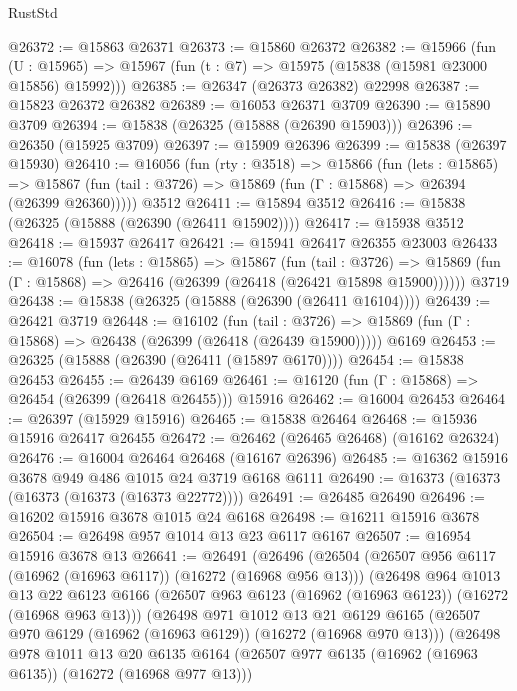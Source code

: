 \begin{lexlean}{RustStd}
\begin{coremodule}
@26372 := @15863 @26371
@26373 := @15860 @26372
@26382 := @15966
    (fun (U : @15965) => @15967 (fun (t : @7) => @15975 (@15838 (@15981 @23000 @15856) @15992)))
@26385 := @26347 (@26373 @26382) @22998
@26387 := @15823 @26372 @26382
@26389 := @16053 @26371 @3709
@26390 := @15890 @3709
@26394 := @15838 (@26325 (@15888 (@26390 @15903)))
@26396 := @26350 (@15925 @3709)
@26397 := @15909 @26396
@26399 := @15838 (@26397 @15930)
@26410 := @16056
    (fun (rty : @3518) =>
    @15866
      (fun (lets : @15865) =>
      @15867 (fun (tail : @3726) => @15869 (fun (Γ : @15868) => @26394 (@26399 @26360)))))
    @3512
@26411 := @15894 @3512
@26416 := @15838 (@26325 (@15888 (@26390 (@26411 @15902))))
@26417 := @15938 @3512
@26418 := @15937 @26417
@26421 := @15941 @26417 @26355 @23003
@26433 := @16078
    (fun (lets : @15865) =>
    @15867
      (fun (tail : @3726) =>
      @15869 (fun (Γ : @15868) => @26416 (@26399 (@26418 (@26421 @15898 @15900))))))
    @3719
@26438 := @15838 (@26325 (@15888 (@26390 (@26411 @16104))))
@26439 := @26421 @3719
@26448 := @16102
    (fun (tail : @3726) => @15869 (fun (Γ : @15868) => @26438 (@26399 (@26418 (@26439 @15900)))))
    @6169
@26453 := @26325 (@15888 (@26390 (@26411 (@15897 @6170))))
@26454 := @15838 @26453
@26455 := @26439 @6169
@26461 := @16120 (fun (Γ : @15868) => @26454 (@26399 (@26418 @26455))) @15916
@26462 := @16004 @26453
@26464 := @26397 (@15929 @15916)
@26465 := @15838 @26464
@26468 := @15936 @15916 @26417 @26455
@26472 := @26462 (@26465 @26468) (@16162 @26324)
@26476 := @16004 @26464 @26468 (@16167 @26396)
@26485 := @16362 @15916 @3678 @949 @486 @1015 @24 @3719 @6168 @6111
@26490 := @16373 (@16373 (@16373 (@16373 (@16373 @22772))))
@26491 := @26485 @26490
@26496 := @16202 @15916 @3678 @1015 @24 @6168
@26498 := @16211 @15916 @3678
@26504 := @26498 @957 @1014 @13 @23 @6117 @6167
@26507 := @16954 @15916 @3678 @13
@26641 := @26491
    (@26496
      (@26504
        (@26507 @956 @6117 (@16962 (@16963 @6117)) (@16272 (@16968 @956 @13)))
        (@26498
          @964
          @1013
          @13
          @22
          @6123
          @6166
          (@26507 @963 @6123 (@16962 (@16963 @6123)) (@16272 (@16968 @963 @13)))
          (@26498
            @971
            @1012
            @13
            @21
            @6129
            @6165
            (@26507 @970 @6129 (@16962 (@16963 @6129)) (@16272 (@16968 @970 @13)))
            (@26498
              @978
              @1011
              @13
              @20
              @6135
              @6164
              (@26507 @977 @6135 (@16962 (@16963 @6135)) (@16272 (@16968 @977 @13)))

\end{coremodule}
\end{lexlean}
